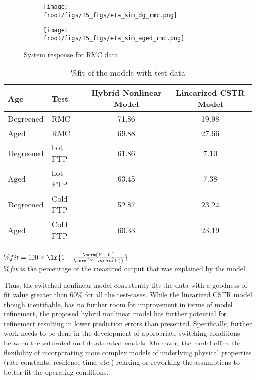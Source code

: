 \begin{figure}[H]
        \begin{minipage}{0.49\textwidth}
                \begin{figure}[H]
                        \centering
                        \texttt{[image: \\froot/figs/15\_figs/eta\_sim\_dg\_rmc.png]}
                \end{figure}
        \end{minipage}
        \begin{minipage}{0.49\textwidth}
                \begin{figure}[H]
                        \centering
                        \texttt{[image: \\froot/figs/15\_figs/eta\_sim\_aged\_rmc.png]}
                \end{figure}
        \end{minipage}
        \caption{System response for RMC data}
\end{figure}


\begin{table}[H]
        \centering
        \caption{$\%$fit of the models with test data}
        \label{tab::results}
        \begin{tabular}{l l c c}
                \hline \hline
                Age & Test & Hybrid Nonlinear Model & Linearized CSTR Model \\ \hline \hline
                Degreened & RMC & 71.86 & 19.98 \\
                Aged      & RMC & 69.88 & 27.66 \\ \hline
                Degreened & hot FTP & 61.86 & 7.10 \\
                Aged      & hot FTP & 63.45 & 7.38 \\ \hline
                Degreened & Cold FTP & 52.87 & 23.24 \\
                Aged      & Cold FTP & 60.33 & 23.19 \\ \hline
                \hline
        \end{tabular}

        $\%fit = 100 \times \lr{1 - \frac{\norm{Y- \hat Y}}{\norm{Y -
        mean(Y)}}}$ \\
        $\%fit$ is the percentage of the measured output that was explained by the
        model.
\end{table}

Thus, the switched nonlinear model consistently fits the data with a goodness of fit value greater than $60\%$ for all
the test-cases. While the linearized CSTR model though identifiable, has no further room for improvement in terms of
model refinement, the proposed hybrid nonlinear model has further potential for refinement resulting in lower prediction
errors than presented. Specifically, further work needs to be done in the development of appropriate switching
conditions between the saturated and desaturated models. Moreover, the model offers the flexibility of incorporating
more complex models of underlying physical properties (rate-constants, residence time, etc.) relaxing or reworking the
assumptions to better fit the operating conditions.
